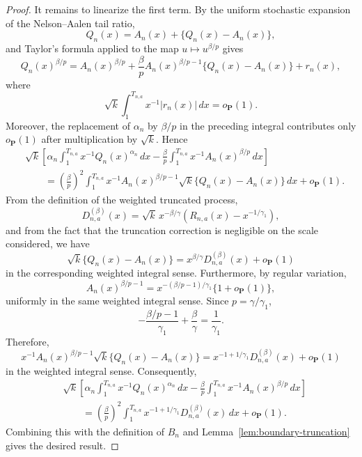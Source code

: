 \documentclass[10pt,a4paper]{amsart}
\begin{document}
\begin{proof}
It remains to linearize the first term. By the uniform stochastic expansion of
the Nelson--Aalen tail ratio,
\[
Q_{n}(x)=A_{n}(x)+\{Q_{n}(x)-A_{n}(x)\},
\]
and Taylor's formula applied to the map $u\mapsto u^{\beta/p}$ gives
\[
Q_{n}(x)^{\beta/p}=A_{n}(x)^{\beta/p}+\frac{\beta}{p}A_{n}(x)^{\beta
/p-1}\{Q_{n}(x)-A_{n}(x)\}+r_{n}(x),
\]
where
\[
\sqrt{k}\int_{1}^{T_{n,a}}x^{-1}|r_{n}(x)|\,dx=o_{\mathbf{P}}(1).
\]
Moreover, the replacement of $\alpha_{n}$ by $\beta/p$ in the preceding
integral contributes only $o_{\mathbf{P}}(1)$ after multiplication by
$\sqrt{k}$. Hence
\[
\begin{aligned}
		&\sqrt{k}
		\left[
		\alpha_n\int_{1}^{T_{n,a}}x^{-1}Q_n(x)^{\alpha_n}\,dx
		-
		\frac{\beta}{p}\int_{1}^{T_{n,a}}x^{-1}A_n(x)^{\beta/p}\,dx
		\right] \\
		&\qquad =
		\left(\frac{\beta}{p}\right)^{2}
		\int_{1}^{T_{n,a}}x^{-1}A_n(x)^{\beta/p-1}
		\sqrt{k}\{Q_n(x)-A_n(x)\}\,dx
		+
		o_{\mathbf P}(1).
	\end{aligned}
\]
From the definition of the weighted truncated process,
\[
D_{n,a}^{(\beta)}(x)=\sqrt{k}\,x^{-\beta/\gamma}\left(  R_{n,a}%
(x)-x^{-1/\gamma_{1}}\right)  ,
\]
and from the fact that the truncation correction is negligible on the scale
considered, we have
\[
\sqrt{k}\{Q_{n}(x)-A_{n}(x)\}=x^{\beta/\gamma}D_{n,a}^{(\beta)}%
(x)+o_{\mathbf{P}}(1)
\]
in the corresponding weighted integral sense. Furthermore, by regular
variation,
\[
A_{n}(x)^{\beta/p-1}=x^{-(\beta/p-1)/\gamma_{1}}\{1+o_{\mathbf{P}}(1)\},
\]
uniformly in the same weighted integral sense. Since $p=\gamma/\gamma_{1}$,
\[
-\frac{\beta/p-1}{\gamma_{1}}+\frac{\beta}{\gamma}=\frac{1}{\gamma_{1}}.
\]
Therefore,
\[
x^{-1}A_{n}(x)^{\beta/p-1}\sqrt{k}\{Q_{n}(x)-A_{n}(x)\}=x^{-1+1/\gamma_{1}%
}D_{n,a}^{(\beta)}(x)+o_{\mathbf{P}}(1)
\]
in the weighted integral sense. Consequently,
\[
\begin{aligned}
		&\sqrt{k}
		\left[
		\alpha_n\int_{1}^{T_{n,a}}x^{-1}Q_n(x)^{\alpha_n}\,dx
		-
		\frac{\beta}{p}\int_{1}^{T_{n,a}}x^{-1}A_n(x)^{\beta/p}\,dx
		\right] \\
		&\qquad =
		\left(\frac{\beta}{p}\right)^{2}
		\int_{1}^{T_{n,a}}x^{-1+1/\gamma_1}D_{n,a}^{(\beta)}(x)\,dx
		+
		o_{\mathbf P}(1).
	\end{aligned}
\]
Combining this with the definition of $B_{n}$ and
Lemma~\ref{lem:boundary-truncation} gives the desired result.
\end{proof}
\end{document}
